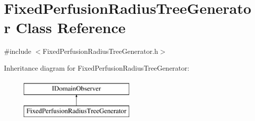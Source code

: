 \hypertarget{class_fixed_perfusion_radius_tree_generator}{}\section{Fixed\+Perfusion\+Radius\+Tree\+Generator Class Reference}
\label{class_fixed_perfusion_radius_tree_generator}


{\ttfamily \#include $<$Fixed\+Perfusion\+Radius\+Tree\+Generator.\+h$>$}

Inheritance diagram for Fixed\+Perfusion\+Radius\+Tree\+Generator\+:\begin{figure}[H]
\begin{center}
\leavevmode
\includegraphics[height=2.000000cm]{d4/dce/class_fixed_perfusion_radius_tree_generator}
\end{center}
\end{figure}
